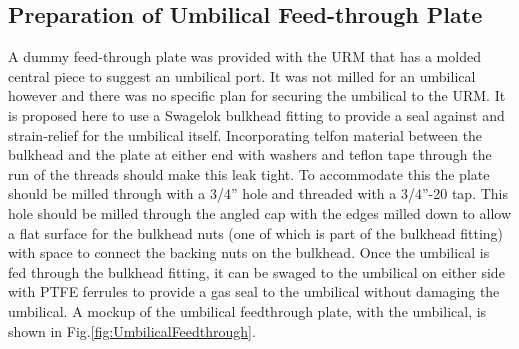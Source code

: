 \documentclass[11pt]{article}
\begin{document}


\subsection{Preparation of Umbilical Feed-through Plate}\label{ss:umbPrepFeed}

A dummy feed-through plate was provided with the URM that has a molded
central piece to suggest an umbilical port. It was not milled for an
umbilical however and there was no specific plan for securing the
umbilical to the URM. It is proposed here to use a Swagelok bulkhead
fitting to provide a seal against and strain-relief for the umbilical
itself. Incorporating telfon material between the bulkhead and the
plate at either end with washers and teflon tape through the run of
the threads should make this leak tight. To accommodate this the plate
should be milled through with a 3/4'' hole and threaded with a
3/4''-20 tap. This hole should be milled through the angled cap with
the edges milled down to allow a flat surface for the bulkhead nuts
(one of which is part of the bulkhead fitting) with space to connect
the backing nuts on the bulkhead.  Once the umbilical is fed through
the bulkhead fitting, it can be swaged to the umbilical on either side
with PTFE ferrules to provide a gas seal to the umbilical without
damaging the umbilical. A mockup of the umbilical feedthrough plate,
with the umbilical, is shown in Fig.\ref{fig:UmbilicalFeedthrough}.
\end{document}
